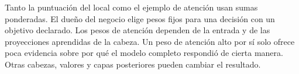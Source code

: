 {Tanto la puntuación del local como el ejemplo de atención usan sumas ponderadas. El dueño del negocio elige pesos fijos para una decisión con un objetivo declarado. Los pesos de atención dependen de la entrada y de las proyecciones aprendidas de la cabeza. Un peso de atención alto por sí solo ofrece poca evidencia sobre por qué el modelo completo respondió de cierta manera. Otras cabezas, valores y capas posteriores pueden cambiar el resultado.}

\section{}

